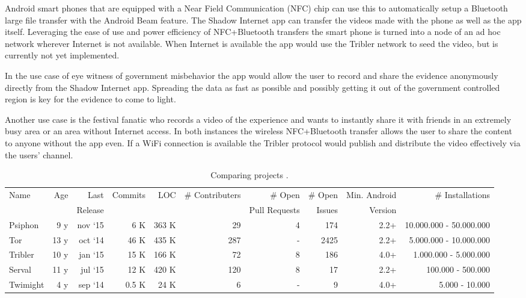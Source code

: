 \documentclass[conference,compsoc]{IEEEtran}
\begin{document}
Android smart phones that are equipped with a Near Field Communication (NFC) chip can use this to automatically setup a Bluetooth large file transfer with the Android Beam feature.
The Shadow Internet app can transfer the videos made with the phone as well as the app itself.
Leveraging the ease of use and power efficiency of NFC+Bluetooth transfers the smart phone is turned into a node of an ad hoc network wherever Internet is not available.
When Internet is available the app would use the Tribler network to seed the video, but is currently not yet implemented.

In the use case of eye witness of government misbehavior the app would allow the user to record and share the evidence anonymously directly from the Shadow Internet app.
Spreading the data as fast as possible and possibly getting it out of the government controlled region is key for the evidence to come to light.

Another use case is the festival fanatic who records a video of the experience and wants to instantly share it with friends in an extremely busy area or an area without Internet access.
In both instances the wireless NFC+Bluetooth transfer allows the user to share the content to anyone without the app even.
If a WiFi connection is available the Tribler protocol would publish and distribute the video effectively via the users' channel.


\begin{table*}
\renewcommand{\arraystretch}{1.4}
\centering
\begin{tabular}{l|*{9}{r}}
Name	&	Age	&	Last	&	Commits	&	LOC	&	\# Contributers		&	\# Open	&	\# Open	&	Min. Android	&	\# Installations	\\
	&		&	Release	&		&		&		&	Pull Requests	&	Issues	&	Version	&	\\
\hline
Psiphon	&	9 y	&	nov `15	&	6 K	&	363 K	&	29	&	4	&	174	&	2.2+	&	10.000.000 - 50.000.000	\\
Tor		&	13 y	&	oct `14	&	46 K	&	435 K	&	287	&	-	&	2425	&	2.2+	&	5.000.000 - 10.000.000	\\
Tribler	&	10 y	&	jan `15	&	15 K	&	166 K	&	72	&	8	&	186	&	4.0+	&	1.000.000 - 5.000.000		\\
Serval	&	11 y	&	jul `15	&	12 K	&	420 K	&	120	&	8	&	17	&	2.2+	&	100.000 - 500.000		\\
Twimight	&	4 y	&	sep `14	&	0.5 K	&	24 K		&	6	&	-	&	9	&	4.0+	&	5.000 - 10.000			\\
\end{tabular}
\vspace{5pt}
\caption{Comparing projects \cite{redecentralize2015alternativeinternet}.}
\label{tab_compareproj}
\end{table*}
\end{document}

